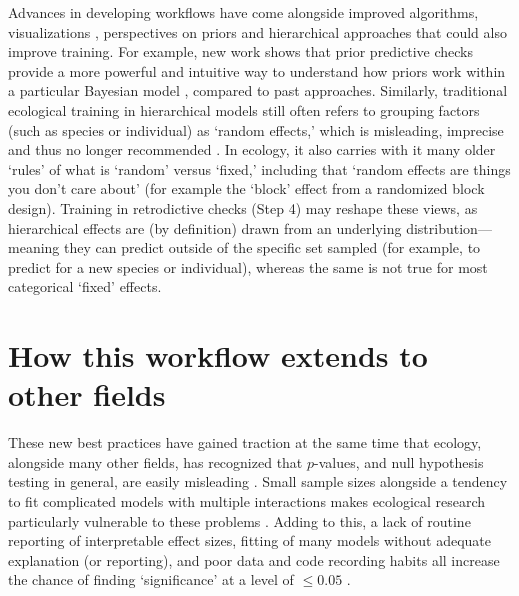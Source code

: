 \documentclass[11pt]{article}
\begin{document}
Advances in developing workflows have come alongside improved algorithms, visualizations \citep[e.g.][]{betanworkflow,vandeschoot2021,gabryvis}, perspectives on priors \citep{BDA,regotherstories,betanprior}  and hierarchical approaches that could also improve training. %
For example, new work shows that prior predictive checks provide a more powerful and intuitive way to understand how priors work within a particular Bayesian model \citep{betanprior}, compared to past approaches. Similarly, traditional ecological training in hierarchical models still often refers to grouping factors (such as species or individual) as `random effects,' which is misleading, imprecise and thus no longer recommended \citep{gelmanhill}. In ecology, it also carries with it many older `rules' of what is `random' versus `fixed,' including that `random effects are things you don't care about' (for example the `block' effect from a randomized block design). Training in retrodictive checks (Step 4) may reshape these views, as hierarchical effects are (by definition) drawn from an underlying distribution---meaning they can predict outside of the specific set sampled (for example, to predict for a new species or individual), whereas the same is not true for most categorical `fixed' effects.

\section*{How this workflow extends to other fields} 

These new best practices have gained traction at the same time that ecology, alongside many other fields, has recognized that $p$-values, and null hypothesis testing in general, are easily misleading \citep{gelman2017statistical,ferraro2020feature,filazzola2021replication,fraser2020role}. Small sample sizes alongside a tendency to fit complicated models with multiple interactions makes ecological research particularly vulnerable to these problems \citep{gelman2015connection}. Adding to this, a lack of routine reporting of interpretable effect sizes, fitting of many models without adequate explanation (or reporting), and poor data and code recording habits all increase the chance of finding `significance' at a level of $\le0.05$ \citep{halsey2015,loken2017}. 
\end{document}
